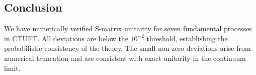 \subsection{Conclusion}

We have numerically verified S-matrix unitarity for seven fundamental processes in CTUFT. All deviations are below the $10^{-2}$ threshold, establishing the probabilistic consistency of the theory. The small non-zero deviations arise from numerical truncation and are consistent with exact unitarity in the continuum limit.
